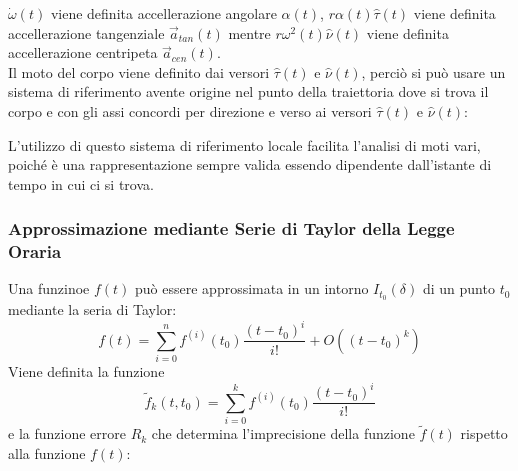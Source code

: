 \documentclass{article}
\numberwithin{equation}{subsection}
\begin{document}
$\dot\omega(t)$ viene definita accellerazione angolare $\alpha(t)$, 
$r\alpha(t)\hat{\tau}(t)$ viene definita accellerazione tangenziale 
$\vec{a}_{tan}(t)$ mentre $r\omega^{2}(t)\hat{\nu}(t)$ viene definita 
accellerazione centripeta $\vec{a}_{cen}(t)$.\\
Il moto del corpo viene definito dai versori $\hat{\tau}(t)$ e $\hat{\nu}(t)$, 
perciò si può usare un sistema di riferimento avente origine nel 
punto della traiettoria dove si trova il corpo e con gli assi 
concordi per direzione e verso ai versori $\hat{\tau}(t)$ e $\hat{\nu}(t)$:

\begin{center}\end{center}

L'utilizzo di questo sistema di riferimento locale facilita 
l'analisi di moti vari, poiché è una rappresentazione sempre 
valida essendo dipendente dall'istante di tempo in cui ci 
si trova.

\subsubsection{Approssimazione mediante Serie di Taylor della Legge Oraria} 
Una funzinoe $f(t)$ può essere approssimata in un intorno $I_{t_0}(\delta)$ 
di un punto $t_0$ mediante la seria di Taylor: 
\begin{equation}
    f(t)=\sum_{i=0}^{n}\displaystyle f^{(i)}(t_0)\frac{(t-t_0)^{i}}{i!}+O((t-t_0)^{k})
\end{equation}
Viene definita la funzione 
\begin{equation}
\tilde{f}_k(t,t_0)=\sum_{i=0}^{k}\displaystyle f^{(i)}(t_0)\frac{(t-t_0)^{i}}{i!}
\end{equation}
e la funzione 
errore $R_k$ che determina l'imprecisione della funzione $\tilde{f}(t)$ 
rispetto alla funzione $f(t)$: 
\end{document}
